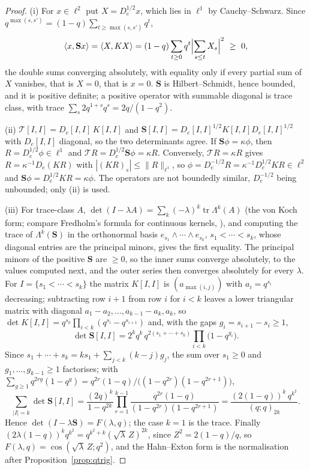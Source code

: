 \documentclass[11pt]{article}
\theoremstyle{plain}
\theoremstyle{definition}
\theoremstyle{remark}
\theoremstyle{plain}\newtheorem*{maintheorem}{Main Theorem}
\begin{document}
\begin{proof}
(i) For $x\in\ell^2$ put $X=D_e^{1/2}x$, which lies in $\ell^1$ by Cauchy--Schwarz. Since
$q^{\max(s,s')}=(1-q)\sum_{t\ge\max(s,s')}q^t$,
\[
   \langle x,\mathbf Sx\rangle=\langle X,KX\rangle
   =(1-q)\sum_{t\ge0}q^t\Bigl|\sum_{s\le t}X_s\Bigr|^2\ \ge\ 0,
\]
the double sums converging absolutely, with equality only if every partial sum of $X$ vanishes,
that is $X=0$, that is $x=0$. $\mathbf S$ is Hilbert--Schmidt, hence bounded, and it is positive
definite; a positive operator with summable diagonal is trace class, with trace
$\sum_s2q^{1+s}q^s=2q/(1-q^2)$.

(ii) $\mathcal T[I,I]=D_e[I,I]\,K[I,I]$ and $\mathbf S[I,I]=D_e[I,I]^{1/2}K[I,I]D_e[I,I]^{1/2}$
with $D_e[I,I]$ diagonal, so the two determinants agree. If $\mathbf S\phi=\kappa\phi$, then
$R=D_e^{1/2}\phi\in\ell^1$ and $\mathcal TR=D_e^{1/2}\mathbf S\phi=\kappa R$. Conversely,
$\mathcal TR=\kappa R$ gives $R=\kappa^{-1}D_e(KR)$ with $|(KR)_s|\le\|R\|_{\ell^1}$, so
$\phi=D_e^{-1/2}R=\kappa^{-1}D_e^{1/2}KR\in\ell^2$ and
$\mathbf S\phi=D_e^{1/2}KR=\kappa\phi$. The operators are not boundedly similar, $D_e^{-1/2}$ being
unbounded; only \textup{(ii)} is used.

(iii) For trace-class $A$, $\det(I-\lambda A)=\sum_k(-\lambda)^k\operatorname{tr}\Lambda^k(A)$
\cite[Ch.~3]{Simon} (the von Koch form; compare Fredholm's formula for continuous kernels,
\cite[Thm.~3.10]{Simon}), and computing the trace of $\Lambda^k(\mathbf
S)$ in the orthonormal basis $e_{s_1}\wedge\cdots\wedge e_{s_k}$, $s_1<\cdots<s_k$, whose diagonal
entries are the principal minors, gives the first equality. The principal minors of the positive
$\mathbf S$ are $\ge0$, so the inner sums converge absolutely, to the values computed next, and the
outer series then converges absolutely for every $\lambda$. For $I=\{s_1<\cdots<s_k\}$ the matrix $K[I,I]$ is $(a_{\max(i,j)})$ with
$a_i=q^{s_i}$ decreasing; subtracting row $i+1$ from row $i$ for $i<k$ leaves a lower triangular
matrix with diagonal $a_1-a_2,\dots,a_{k-1}-a_k,a_k$, so
$\det K[I,I]=q^{s_k}\prod_{i<k}(q^{s_i}-q^{s_{i+1}})$ and, with the gaps
$g_i=s_{i+1}-s_i\ge1$,
\[
   \det\mathbf S[I,I]=2^kq^k\,q^{2(s_1+\cdots+s_k)}\prod_{i<k}\bigl(1-q^{g_i}\bigr).
\]
Since $s_1+\cdots+s_k=ks_1+\sum_{j<k}(k-j)g_j$, the sum over $s_1\ge0$ and $g_1,\dots,g_{k-1}\ge1$
factorises; with $\sum_{g\ge1}q^{2rg}(1-q^g)=q^{2r}(1-q)/\bigl((1-q^{2r})(1-q^{2r+1})\bigr)$,
\[
   \sum_{|I|=k}\det\mathbf S[I,I]
   =\frac{(2q)^k}{1-q^{2k}}\prod_{r=1}^{k-1}\frac{q^{2r}(1-q)}{(1-q^{2r})(1-q^{2r+1})}
   =\frac{(2(1-q))^k\,q^{k^2}}{(q;q)_{2k}} .
\]
Hence $\det(I-\lambda\mathbf S)=F(\lambda,q)$; the case $k=1$ is the trace. Finally
$(2\lambda(1-q))^kq^{k^2}=q^{k^2+k}(\sqrt\lambda\,Z)^{2k}$, since $Z^2=2(1-q)/q$, so
$F(\lambda,q)=\cos(\sqrt\lambda\,Z;q^2)$, and the Hahn--Exton form is the normalisation after
Proposition~\ref{prop:qtrig}.


\end{proof}
\end{document}
